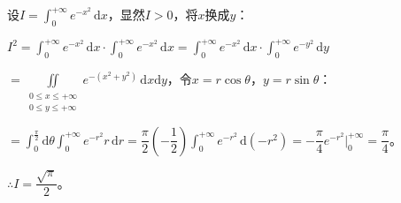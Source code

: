 \documentclass[UTF8, 12pt]{ctexart}
\begin{document}
设$I=\int_0^{+\infty}e^{-x^2}\,\textrm{d}x$，显然$I>0$，将$x$换成$y$：

$I^2=\int_0^{+\infty}e^{-x^2}\,\textrm{d}x\cdot\int_0^{+\infty}e^{-x^2}\,\textrm{d}x=\int_0^{+\infty}e^{-x^2}\,\textrm{d}x\cdot\int_0^{+\infty}e^{-y^2}\,\textrm{d}y$

$=\displaystyle{\iint\limits_{\substack{0\leqslant x\leqslant+\infty\\0\leqslant y\leqslant+\infty}}e^{-(x^2+y^2)}\,\textrm{d}x\textrm{d}y}$，令$x=r\cos\theta$，$y=r\sin\theta$：

$=\displaystyle{\int_0^\frac{\pi}{2}\textrm{d}\theta\int_0^{+\infty}e^{-r^2}r\,\textrm{d}r=\dfrac{\pi}{2}\left(-\dfrac{1}{2}\right)\int_0^{+\infty}e^{-r^2}\,\textrm{d}(-r^2)=-\dfrac{\pi}{4}e^{-r^2}\bigg\vert_0^{+\infty}}=\dfrac{\pi}{4}$。

$\therefore I=\dfrac{\sqrt{\pi}}{2}$。
\end{document}
